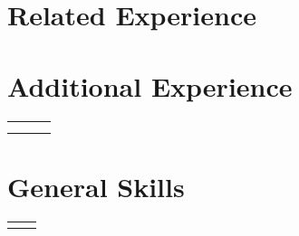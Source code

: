 \documentclass{article}
\begin{document}
\section{Related Experience}

    
    
    


\section{Additional Experience}

    \begin{flushleft}
        \begin{tabularx}{\textwidth}{l l R}
                      \\
                         \\
              \\
            
        \end{tabularx}
    \end{flushleft}


\section{General Skills}

    \begin{flushleft}
        \begin{tabular}{>{\raggedleft\arraybackslash}p{1.25in} >{\raggedright\arraybackslash}p{5.85in}}
             \\
             \\
            
        \end{tabular}
    \end{flushleft}
\end{document}
